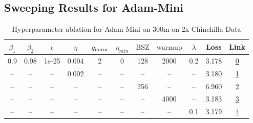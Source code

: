 \subsection{Sweeping Results for Adam-Mini}%
\begin{table}[H]
\centering
\caption{Hyperparameter ablation for Adam-Mini on 300m on 2x Chinchilla Data}
\label{tab:ablation_adam-mini_300m_on_2x_chinchilla_data}
\begin{tabular}{ccccccccccc}
\toprule
$\beta_1$ & $\beta_2$ & $\epsilon$ & $\eta$ & $g_{\mathrm{norm}}$ & $\eta_{min}$ & $\mathrm{BSZ}$ & $\mathrm{warmup}$ & $\lambda$ & Loss & Link \\
\midrule
0.9 & 0.98 & 1e-25 & 0.004 & 2 & 0 & 128 & 2000 & 0.2 & 3.178 & \href{https://wandb.ai/marin-community/optimizer-scaling/runs/sweep-300m-12B-mini9676c0lr0.004-wd0.2-minlr0-warmup2000-b10.9-b-80350d}{0} \\
\midrule
-- & -- & -- & 0.002 & -- & -- & -- & -- & -- & 3.180 & \href{https://wandb.ai/marin-community/optimizer-scaling/runs/sweep-300m-12B-mini4cf513lr0.002-wd0.2-minlr0-warmup2000-b10.9-b-df6367}{1} \\
-- & -- & -- & -- & -- & -- & 256 & -- & -- & 6.960 & \href{https://wandb.ai/marin-community/optimizer-scaling/runs/sweep-300m-12B-mini65d3bflr0.004-wd0.2-minlr0-warmup2000-b10.9-b-79c803}{2} \\
-- & -- & -- & -- & -- & -- & -- & 4000 & -- & 3.183 & \href{https://wandb.ai/marin-community/optimizer-scaling/runs/sweep-300m-12B-minic35a69lr0.004-wd0.2-minlr0-warmup4000-b10.9-b-05ae30}{3} \\
-- & -- & -- & -- & -- & -- & -- & -- & 0.1 & 3.179 & \href{https://wandb.ai/marin-community/optimizer-scaling/runs/sweep-300m-12B-minif8c6e5lr0.004-wd0.1-minlr0-warmup2000-b10.9-b-aa6c53}{4} \\
\bottomrule
\end{tabular}
\end{table}

